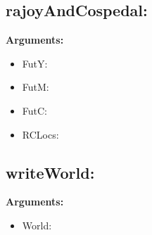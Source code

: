 \documentclass[11pt]{article}
\begin{document}
\subsection{rajoyAndCospedal:}
\textbf{Arguments:}
\begin{itemize}
\item FutY:
\item FutM:
\item FutC:
\item RCLocs:
\end{itemize}
\subsection{writeWorld:}
\textbf{Arguments:}
\begin{itemize}
\item World:
\end{itemize}
\end{document}
